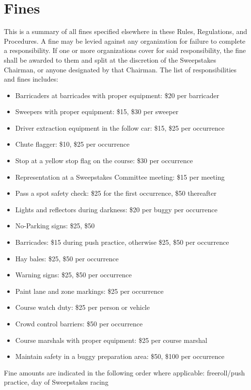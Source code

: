	\section{Fines}
		This is a summary of all fines specified elsewhere in these Rules, Regulations, 
		and Procedures. A fine may be levied against any organization for failure to complete
		a responsibility. If one or more organizations cover for said responsibility, the fine
		shall be awarded to them and split at the discretion of the Sweepstakes Chairman, or 
		anyone designated by that Chairman. The list of responsibilities and fines includes:

		\begin{itemize}

			\item Barricaders at barricades with proper equipment: \$20 per barricader
			
			\item Sweepers with proper equipment: \$15, \$30 per sweeper
			
			\item Driver extraction equipment in the follow car: \$15, \$25 per occurrence
			
			\item Chute flagger: \$10, \$25 per occurrence
			
			\item Stop at a yellow stop flag on the course: \$30 per occurrence

			\item Representation at a Sweepstakes Committee meeting: \$15 per meeting

			\item Pass a spot safety check: \$25 for the first occurrence, \$50 thereafter
			
			\item Lights and reflectors during darkness: \$20 per buggy per occurrence

			\item No-Parking signs: \$25, \$50
			
			\item Barricades: \$15 during push practice, otherwise \$25, \$50 per occurrence

			\item Hay bales: \$25, \$50 per occurrence
			
			\item Warning signs: \$25, \$50 per occurrence

			\item Paint lane and zone markings: \$25 per occurrence

			\item Course watch duty: \$25 per person or vehicle

			\item Crowd control barriers: \$50 per occurrence

			\item Course marshals with proper equipment: \$25 per course marshal
			
			\item Maintain safety in a buggy preparation area: \$50, \$100 per occurrence

		\end{itemize}

		\noindent Fine amounts are indicated in the following order where applicable: \newline
		freeroll/push practice, day of Sweepstakes racing
